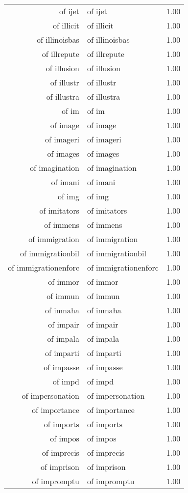 \begin{table}[ht]
\begin{tabular}{rlr}
  of ijet & of ijet & 1.00 \\ 
  of illicit & of illicit & 1.00 \\ 
  of illinoisbas & of illinoisbas & 1.00 \\ 
  of illrepute & of illrepute & 1.00 \\ 
  of illusion & of illusion & 1.00 \\ 
  of illustr & of illustr & 1.00 \\ 
  of illustra & of illustra & 1.00 \\ 
  of im & of im & 1.00 \\ 
  of image & of image & 1.00 \\ 
  of imageri & of imageri & 1.00 \\ 
  of images & of images & 1.00 \\ 
  of imagination & of imagination & 1.00 \\ 
  of imani & of imani & 1.00 \\ 
  of img & of img & 1.00 \\ 
  of imitators & of imitators & 1.00 \\ 
  of immens & of immens & 1.00 \\ 
  of immigration & of immigration & 1.00 \\ 
  of immigrationbil & of immigrationbil & 1.00 \\ 
  of immigrationenforc & of immigrationenforc & 1.00 \\ 
  of immor & of immor & 1.00 \\ 
  of immun & of immun & 1.00 \\ 
  of imnaha & of imnaha & 1.00 \\ 
  of impair & of impair & 1.00 \\ 
  of impala & of impala & 1.00 \\ 
  of imparti & of imparti & 1.00 \\ 
  of impasse & of impasse & 1.00 \\ 
  of impd & of impd & 1.00 \\ 
  of impersonation & of impersonation & 1.00 \\ 
  of importance & of importance & 1.00 \\ 
  of imports & of imports & 1.00 \\ 
  of impos & of impos & 1.00 \\ 
  of imprecis & of imprecis & 1.00 \\ 
  of imprison & of imprison & 1.00 \\ 
  of impromptu & of impromptu & 1.00 \\ 

\end{tabular}
\end{table}
